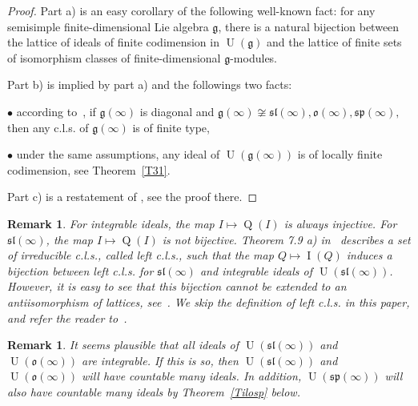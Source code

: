 \documentclass{emsprocart}
\newtheorem{remark}[theorem]{Remark}
\begin{document}
\begin{proof} Part a) is an easy corollary of the following well-known fact: for any semisimple finite-dimensional Lie algebra $\mathfrak g$, there is a natural bijection between the lattice of ideals of finite codimension in $\operatorname{U}(\mathfrak g)$ and the lattice of finite sets of isomorphism classes of finite-dimensional $\mathfrak g$-modules.

Part b) is implied by part a) and the followings two facts:

$\bullet$ according to~\cite{Zh3}, if $\mathfrak g(\infty)$ is diagonal and $\mathfrak g(\infty)\not\cong\mathfrak{sl}(\infty), \mathfrak o(\infty), \mathfrak{sp}(\infty),$ then any c.l.s. of $\mathfrak g(\infty)$ is of finite type,

$\bullet$ under the same assumptions, any ideal of $\operatorname{U}(\mathfrak g(\infty))$ is of locally finite codimension, see Theorem~\ref{T31}.

Part c) is a restatement of \cite[Theorem~7.9b)]{PP1}, see the proof there.
\end{proof}
\begin{remark}\label{R45} For integrable ideals, the map $I\mapsto \operatorname{Q}(I)$ is always injective. For $\mathfrak{sl}(\infty)$, the map $I\mapsto \operatorname{Q}(I)$ is not bijective. Theorem 7.9 a) in~\cite{PP1} describes a set of irreducible c.l.s., called {\it left c.l.s.}, such that the map $Q\mapsto \operatorname{I}(Q)$ induces a bijection between left c.l.s. for $\mathfrak{sl}(\infty)$ and integrable ideals of $\operatorname{U}(\mathfrak{sl}(\infty))$. However, it is easy to see that
this bijection cannot be extended to an antiisomorphism of lattices, see~\cite{PP1}. We skip the definition of left c.l.s. in this paper, and refer the reader to~\cite{PP1}.\end{remark}
\begin{remark}It seems plausible that all ideals of $\operatorname{U}(\mathfrak{sl}(\infty))$ and $\operatorname{U}(\mathfrak o(\infty))$ are integrable. If this is so, then $\operatorname{U}(\mathfrak{sl}(\infty))$ and $\operatorname{U}(\mathfrak{o}(\infty))$ will have countable many ideals. In addition, $\operatorname{U}(\mathfrak{sp}(\infty))$ will also have countable many ideals by Theorem~\ref{Tilosp} below.\end{remark}
\end{document}
